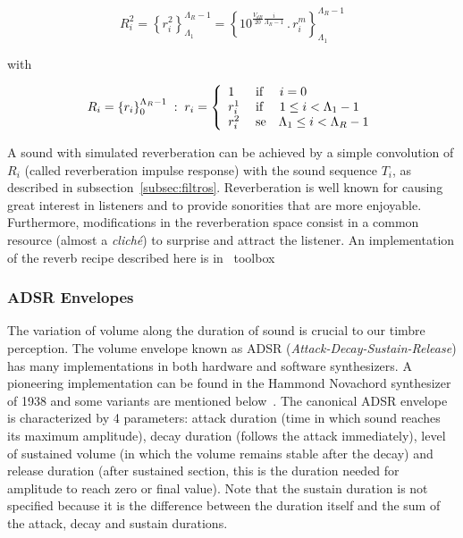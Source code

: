 \begin{equation}\label{eq:p2rev}
    R_i^2=\left\{r_i^2\right\}_{\Lambda_1}^{\Lambda_R-1}=\left\{10^{\frac{V_{dB}}{20}\frac{i}{\Lambda_R-1}}\,.\,r_i^m\right\}_{\Lambda_1}^{\Lambda_R-1}
\end{equation}

\noindent with

\begin{equation}\label{eq:rev}
    R_i=\left\{r_i\right\}_0^{\Lambda_R-1}\;:\;r_i=\left\{
        \begin{array}{l l}
            1\; & \text{if }\quad i=0 \\
            r_i^1\;  & \text{if }\quad 1\leq i<\Lambda_1-1 \\
                                     r_i^2 \; & \text{se}\quad \Lambda_1 \leq i < \Lambda_R-1 \\
        \end{array} \right.
\end{equation}

A sound with simulated reverberation can be achieved by a simple convolution of $R_i$ (called reverberation impulse response) with the sound sequence $T_i$, as described in subsection~\ref{subsec:filtros}. Reverberation is well known for causing great interest in listeners and to provide sonorities that are more enjoyable. Furthermore, modifications in the reverberation space consist in a common resource (almost a \textit{clich\'{e}}) to surprise and attract the listener. An implementation of the reverb recipe described here is in \massa\ toolbox~\cite{MASSA}

\subsubsection{ADSR Envelopes}
The variation of volume along the duration of sound is crucial to our timbre perception. The volume envelope known as ADSR (\emph{Attack-Decay-Sustain-Release}) has many implementations in both hardware and software synthesizers. A pioneering implementation can be found in the Hammond Novachord synthesizer of 1938 and some variants are mentioned below~\cite{ADSR}. The canonical ADSR envelope is characterized by 4 parameters: attack duration (time in which sound reaches its maximum amplitude), decay duration (follows the attack immediately), level of sustained volume (in which the volume remains stable after the decay) and release duration (after sustained section, this is the duration needed for amplitude to reach zero or final value).
Note that the sustain duration is not specified because it is the difference between the duration itself and the sum of the attack, decay and sustain durations.

